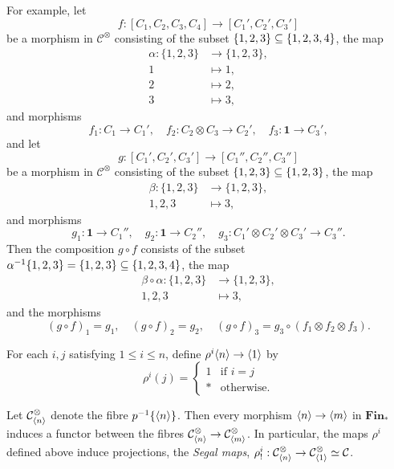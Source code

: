 \documentclass{MetricNotes2023}
\def\subq{\ensuremath\subseteq}
\begin{document}
For example, let 
\[f : [C_1, C_2, C_3, C_4]\to [C_1', C_2', C_3']\]
be a morphism in \(\mathcal{C}^\otimes\) consisting of the subset \(\{1, 2, 3\}\subq \{1, 2, 3, 4\}\), the map
\begin{align*}
\alpha : \{1, 2, 3\}&\to \{1, 2, 3\},\\
1 &\mapsto 1,\\
2 &\mapsto 2,\\
3 &\mapsto 3,
\end{align*}
and morphisms
\[f_1 : C_1 \to C_1', \quad f_2 : C_2 \otimes C_3 \to C_2', \quad f_3 : \textbf{1}\to C_3',\]
and let 
\[g : [C_1', C_2', C_3'] \to [C_1'', C_2'', C_3'']\]
be a morphism in \(\mathcal{C}^\otimes\) consisting of the subset \(\{1, 2, 3\}\subq \{1, 2, 3\}\), the map
\begin{align*}
\beta : \{1, 2, 3\}&\to \{1, 2, 3\},\\
1, 2, 3 &\mapsto 3,
\end{align*}
and morphisms
\[g_1 : \textbf{1} \to C_1'', \quad g_2 : \textbf{1} \to C_2'', \quad g_3 : C_1'\otimes C_2'\otimes C_3' \to C_3''.\]
Then the composition \(g \circ f \) consists of the subset \(\alpha^{-1}\{1, 2, 3\}=\{1, 2, 3\}\subq \{1, 2, 3, 4\}\), the map
\begin{align*}
\beta \circ \alpha : \{1, 2, 3\}&\to \{1, 2, 3\},\\
1, 2, 3 &\mapsto 3,
\end{align*}
and the morphisms
\[(g\circ f)_1 =g_1, \quad (g\circ f)_2 = g_2, \quad (g \circ f)_3 = g_3 \circ (f_1 \otimes f_2 \otimes f_3).\]

For each \(i, j\) satisfying \(1 \leq i \leq n\), define  \(\rho^i \langle n\rangle\to \langle1\rangle\) by
\[\rho^i(j)=\begin{cases}
1 &\text{if } i = j\\
* &\text{otherwise.}
\end{cases}\]

\begin{remark}
Let \(\mathcal{C}^\otimes_{\langle n\rangle}\) denote the fibre \(p^{-1}\{\langle n\rangle\}\). Then every morphism \(\langle n\rangle\to \langle m\rangle\) in \(\textbf{Fin}_*\) induces a functor between the fibres \(\mathcal{C}^\otimes_{\langle n\rangle}\to \mathcal{C}^\otimes_{\langle m\rangle}\). In particular, the maps \(\rho^i\) defined above induce projections, the \textit{Segal maps}, \(\rho_!^i : \mathcal{C}^\otimes_{\langle n\rangle}\to \mathcal{C}^\otimes_{\langle1\rangle}\simeq \mathcal{C}\).
\end{remark}
\end{document}
